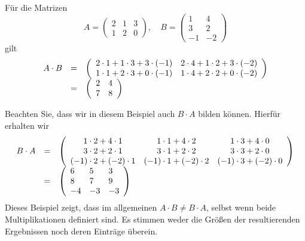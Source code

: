 \begin{beispiel}Für die Matrizen 
  	$$ A = \left( \begin{matrix}  2 & 1 & 3 \\ 1 & 2 & 0
	\end{matrix} \right), \quad B =  \left( \begin{matrix}  1 & 4 \\ 3  & 2 \\ -1 & -2 
  	\end{matrix} \right) $$
gilt 
  	$$ \begin{array} {l c l} 
  	A \cdot B & = & \left( \begin{array} { c c }
	2 \cdot 1 + 1 \cdot 3 + 3 \cdot (-1) & 2 \cdot 4 + 1 \cdot 2 + 3 \cdot (-2) \\
	1 \cdot 1 + 2 \cdot 3 + 0 \cdot (-1) & 1 \cdot 4 + 2 \cdot 2 + 0 \cdot (-2) 
	\end{array} \right) \\
  	& = & \left( \begin{array}{ l l }
	2 & 4  \\ 7 & 8  
	\end{array} \right) 
  	\end{array} $$

Beachten Sie, dass wir in diesem Beispiel auch $B \cdot A$ bilden können. Hierfür erhalten wir
  	$$ \begin{array} {l c l} 
  	B \cdot A & = & \left( \begin{array} { c c c }
	1 \cdot 2 + 4 \cdot 1 & 1 \cdot 1 + 4 \cdot 2 & 1 \cdot 3 + 4 \cdot 0 \\
	3 \cdot 2 + 2 \cdot 1 & 3 \cdot 1 + 2 \cdot 2 & 3 \cdot 3 + 2 \cdot 0 \\
	(-1) \cdot 2 + (-2) \cdot 1 & (-1) \cdot 1 + (-2) \cdot 2 & (-1) \cdot 3 + (-2) \cdot 0 
	\end{array} \right) \\
  	& = & \left( \begin{array}{ l l l }
	6 & 5 & 3 \\ 8 & 7 & 9 \\ -4 & -3 & -3  
	\end{array} \right) 
 	\end{array} $$
Dieses Beispiel zeigt, dass im allgemeinen  $A \cdot B \neq B \cdot A$, selbst wenn beide Multiplikationen 
definiert sind. Es stimmen weder die Größen der resultierenden Ergebnissen noch deren Einträge 
überein. 
\end{beispiel}

